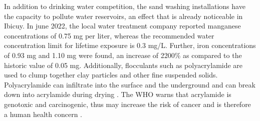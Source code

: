 In addition to drinking water competition, the sand washing installations have the capacity to pollute water reservoirs, an effect that is already noticeable in Ibicuy. In june 2022, the local water treatment company reported manganese concentrations of 0.75 mg per liter, whereas the recommended water concentration limit for lifetime exposure is 0.3 mg/L. Further, iron concentrations of 0.93 mg and 1.10 mg were found, an increase of 2200\% as compared to the historic value of 0.05 mg. Additionally, flocculants such as polyacrylamide are used to clump together clay particles and other fine suspended solids. Polyacrylamide can infiltrate into the surface and the underground and can break down into acrylamide during drying \autocite{fogliaSedArena2023}. The WHO warns that acrylamide is genotoxic and carcinogenic, thus may increase the risk of cancer and is therefore a human health concern \autocite{worldhealthorganizationAcrylamide2011}.